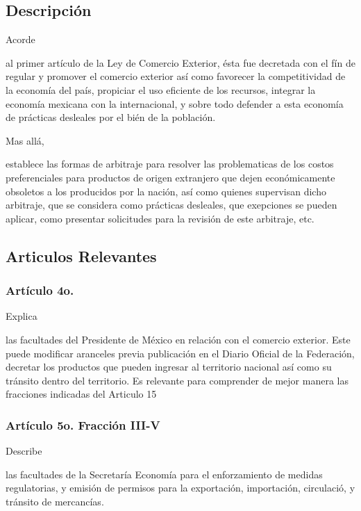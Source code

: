 \documentclass[stu, 12pt, letterpaper, donotrepeattitle, floatsintext, natbib]{apa7}
\begin{document}
\subsection{Descripción}
Acorde \begin{justifying}
    al primer artículo \citep{ley-comercio} de
    la Ley de Comercio Exterior, ésta fue decretada con el fín de regular y promover el comercio exterior así como favorecer la competitividad de la economía del país, propiciar el uso eficiente
    de los recursos, integrar la economía mexicana con la internacional, y sobre todo defender a esta economía de prácticas desleales por el bién de la población.\par
\end{justifying}
Mas allá, \begin{justify}
    establece las formas de arbitraje para resolver las problematicas de los costos preferenciales para productos de origen extranjero que dejen económicamente obsoletos a los producidos por la nación, así
    como quienes supervisan dicho arbitraje, que se considera como prácticas desleales, que exepciones se pueden aplicar, como presentar solicitudes para la revisión de este arbitraje, etc.\par
\end{justify}
\vspace{\baselineskip}
\subsection{Articulos Relevantes}
\subsubsection{Artículo 4o.}
Explica \begin{justifying}
    las facultades del Presidente de México en relación con el comercio exterior. Este puede modificar aranceles previa publicación en el Diario Oficial de la Federación, decretar los productos que pueden ingresar
    al territorio nacional así como su tránsito dentro del territorio. Es relevante para comprender de mejor manera las fracciones indicadas del Articulo 15\par
\end{justifying}
\vspace{\baselineskip}
\subsubsection{Artículo 5o. Fracción III-V}
Describe \begin{justifying}
    las facultades de la Secretaría Economía para el enforzamiento de medidas regulatorias, y emisión de permisos para la exportación, importación, circulació, y tránsito de mercancías.\par
\end{justifying}
\vspace{\baselineskip}
\end{document}

